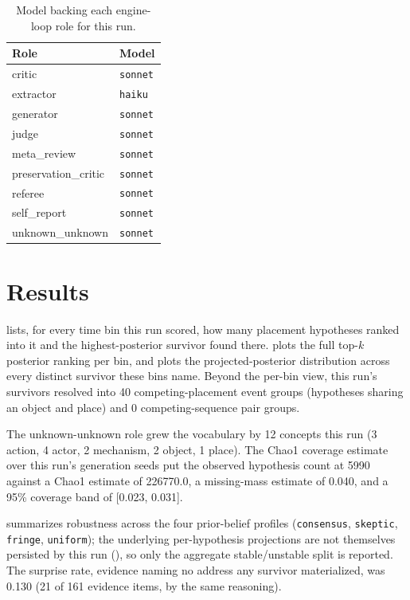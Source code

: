 \documentclass[11pt]{article}
\begin{document}
\begin{table}[htbp]
  \centering
  \caption{Model backing each engine-loop role for this run.}
  \label{tab:models}
  \begin{tabular}{@{}ll@{}}
    \toprule
    Role & Model \\
    \midrule
    critic & \texttt{sonnet} \\
    extractor & \texttt{haiku} \\
    generator & \texttt{sonnet} \\
    judge & \texttt{sonnet} \\
    meta\_review & \texttt{sonnet} \\
    preservation\_critic & \texttt{sonnet} \\
    referee & \texttt{sonnet} \\
    self\_report & \texttt{sonnet} \\
    unknown\_unknown & \texttt{sonnet} \\
    \bottomrule
  \end{tabular}
\end{table}

\section{Results}
\label{sec:results}

 lists, for every time bin this run scored, how many placement hypotheses ranked into it and the highest-posterior survivor found there.  plots the full top-$k$ posterior ranking per bin, and  plots the projected-posterior distribution across every distinct survivor these bins name. Beyond the per-bin view, this run's survivors resolved into 40 competing-placement event groups (hypotheses sharing an object and place) and 0 competing-sequence pair groups.

The unknown-unknown role grew the vocabulary by 12 concepts this run (3 action, 4 actor, 2 mechanism, 2 object, 1 place). The Chao1 coverage estimate over this run's generation seeds put the observed hypothesis count at 5990 against a Chao1 estimate of 226770.0, a missing-mass estimate of 0.040, and a 95\% coverage band of [0.023, 0.031].

 summarizes robustness across the four prior-belief profiles (\texttt{consensus}, \texttt{skeptic}, \texttt{fringe}, \texttt{uniform}); the underlying per-hypothesis projections are not themselves persisted by this run (), so only the aggregate stable/unstable split is reported. The surprise rate, evidence naming no address any survivor materialized, was 0.130 (21 of 161 evidence items, by the same reasoning).
\end{document}
